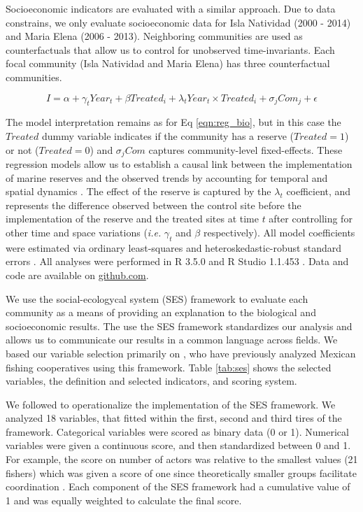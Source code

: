 \documentclass{frontiersSCNS}
\theoremstyle{definition}
\theoremstyle{definition}
\theoremstyle{definition}
\theoremstyle{remark}
\begin{document}
Socioeconomic indicators are evaluated with a similar approach. Due to
data constrains, we only evaluate socioeconomic data for Isla Natividad
(2000 - 2014) and Maria Elena (2006 - 2013). Neighboring communities are
used as counterfactuals that allow us to control for unobserved
time-invariants. Each focal community (Isla Natividad and Maria Elena)
has three counterfactual communities.

\begin{equation}
I = \alpha + \gamma_{t} Year_t + \beta Treated_i + \lambda_{t} Year_t\times Treated_i + \sigma_jCom_j +\epsilon
\label{eqn:soc_reg}
\end{equation}

The model interpretation remains as for Eq \ref{eqn:reg_bio}, but in
this case the \(Treated\) dummy variable indicates if the community has
a reserve (\(Treated = 1\)) or not (\(Treated = 0\)) and \(\sigma_jCom\)
captures community-level fixed-effects. These regression models allow us
to establish a causal link between the implementation of marine reserves
and the observed trends by accounting for temporal and spatial dynamics
\citep{depalma_2018}. The effect of the reserve is captured by the
\(\lambda_t\) coefficient, and represents the difference observed
between the control site before the implementation of the reserve and
the treated sites at time \(t\) after controlling for other time and
space variations (\emph{i.e.} \(\gamma_t\) and \(\beta\) respectively).
All model coefficients were estimated via ordinary least-squares and
heteroskedastic-robust standard errors \citep{zeileis_2004-7n}. All
analyses were performed in R 3.5.0 and R Studio 1.1.453 \citep{R_2018}.
Data and code are available on
\href{https://github.com/jcvdav/ReserveEffect}{github.com}.

We use the social-ecologycal system (SES) framework to evaluate each
community as a means of providing an explanation to the biological and
socioeconomic results. The use the SES framework standardizes our
analysis and allows us to communicate our results in a common language
across fields. We based our variable selection primarily on
\citet{leslie_2015-na,basurto_2013-oq}, who have previously analyzed
Mexican fishing cooperatives using this framework. Table \ref{tab:ses}
shows the selected variables, the definition and selected indicators,
and scoring system.

We followed \citet{leslie_2015-na} to operationalize the implementation
of the SES framework. We analyzed 18 variables, that fitted within the
first, second and third tires of the framework. Categorical variables
were scored as binary data (0 or 1). Numerical variables were given a
continuous score, and then standardized between 0 and 1. For example,
the score on number of actors was relative to the smallest values (21
fishers) which was given a score of one since theoretically smaller
groups facilitate coordination \citep{viana_2018}. Each component of the
SES framework had a cumulative value of 1 and was equally weighted to
calculate the final score.
\end{document}
